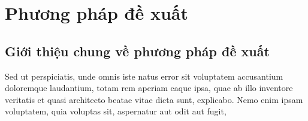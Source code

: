 \chapter{Phương pháp đề xuất}
\label{chap:attrel}

\section{Giới thiệu chung về phương pháp đề xuất}

Sed ut perspiciatis, unde omnis iste natus error sit voluptatem accusantium doloremque laudantium, totam rem aperiam eaque ipsa, quae ab illo inventore veritatis et quasi architecto beatae vitae dicta sunt, explicabo. Nemo enim ipsam voluptatem, quia voluptas sit, aspernatur aut odit aut fugit, 